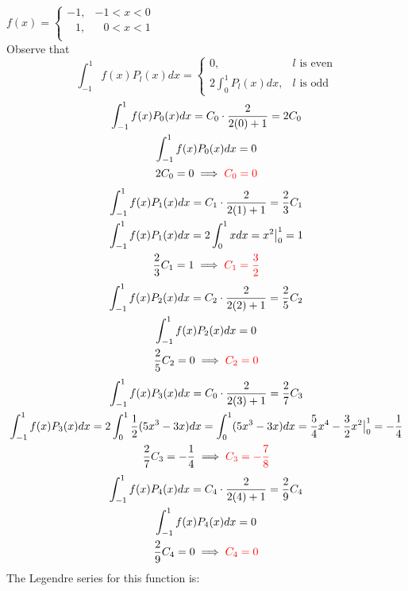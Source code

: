 \item [1.] $\displaystyle f(x) = 
\begin{cases}
    -1, & -1 < x < 0\\
    \:\:\,\,1, & \:\:\,\,0 < x < 1\\
\end{cases}$\\[5mm]
Observe that
\[
    \int_{-1}^1f(x)P_l(x)dx =
    \begin{cases}
        0, & l \text{ is even}\\
        2 \int_0^1 P_l(x)dx, & l \text{ is odd}
    \end{cases}
\]
\begin{gather*}
    \int_{-1}^{1}f(x)P_0(x)dx =C_0\cdot \frac{2}{2(0)+1} = 2C_0\\
    \int_{-1}^{1}f(x)P_0(x)dx = 0\\
    2C_0 = 0 \implies \textcolor{red}{C_0 = 0}
\end{gather*}
\begin{gather*}
    \int_{-1}^{1}f(x)P_1(x)dx =C_1\cdot \frac{2}{2(1)+1} = \frac{2}{3}C_1\\
    \int_{-1}^{1}f(x)P_1(x)dx 
    = 2\int_0^1 x dx = x^2\big|_0^1 = 1\\
    \frac{2}{3}C_1 = 1 \implies \textcolor{red}{C_1 = \frac{3}{2}}
\end{gather*}
\begin{gather*}
    \int_{-1}^{1}f(x)P_2(x)dx =C_2\cdot \frac{2}{2(2)+1} = \frac{2}{5}C_2\\
    \int_{-1}^{1}f(x)P_2(x)dx = 0\\
    \frac{2}{5}C_2 = 0 \implies \textcolor{red}{C_2 = 0}
\end{gather*}
\begin{gather*}
    \int_{-1}^{1}f(x)P_3(x)dx =C_0\cdot \frac{2}{2(3)+1} = \frac{2}{7}C_3\\
    \int_{-1}^{1}f(x)P_3(x)dx 
    = 2\int_0^1 \frac{1}{2}(5x^3-3x) dx 
    = \int_0^1 (5x^3-3x) dx
    = \frac{5}{4}x^4-\frac{3}{2}x^2\big|_0^1 
    = -\frac{1}{4}\\
    \frac{2}{7}C_3 = -\frac{1}{4} \implies \textcolor{red}{C_3 = -\frac{7}{8}}
\end{gather*}
\begin{gather*}
    \int_{-1}^{1}f(x)P_4(x)dx =C_4\cdot \frac{2}{2(4)+1} = \frac{2}{9}C_4\\
    \int_{-1}^{1}f(x)P_4(x)dx = 0\\
    \frac{2}{9}C_4 = 0 \implies \textcolor{red}{C_4 = 0}
\end{gather*}
The Legendre series for this function is:
